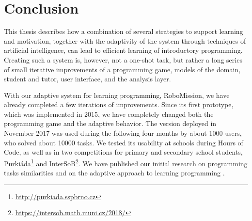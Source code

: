 \chapter{Conclusion}
\label{chap:conclusion}



This thesis describes how a combination of several strategies to support
learning and motivation, together with the adaptivity of the system
through techniques of artificial intelligence,
can lead to efficient learning of introductory programming. %
Creating such a system is, however, not a one-shot task, but rather a long series
of small iterative improvements of a programming game,
models of the domain, student and tutor, user interface, and the analysis layer.

With our adaptive system for learning programming, RoboMission,
we have already completed a few iterations of improvements.
Since its first prototype, which was implemented in 2015,
we have completely changed both the programming game and the adaptive behavior.
The version deployed in November 2017 was used during the following four months
by about 1000 users, who solved about 10000 tasks.
We tested its usability at schools during Hours of Code,
as well as in two competitions for primary and secondary school students,
Purkiáda\footnote{\url{http://purkiada.sspbrno.cz}} and
InterSoB\footnote{\url{https://intersob.math.muni.cz/2018/}}.
We have published  our initial research on programming tasks similarities \cite{alg.similarity}
and on the adaptive approach to learning programming \cite{robomission}.




